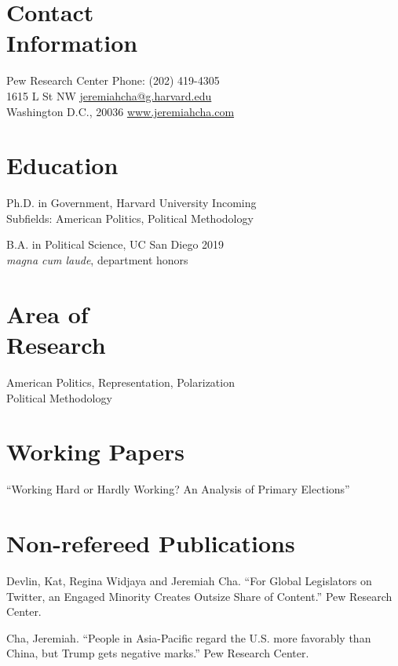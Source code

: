 \documentclass[margin, line]{res}
\begin{document}
\begin{resume}

\section{Contact \\ Information} 
Pew Research Center \hfill Phone: (202) 419-4305\\
1615 L St NW \hfill \href{mailto:jeremiahcha@g.harvard.edu}{jeremiahcha@g.harvard.edu}\\
Washington D.C., 20036 \hfill \href{httsp://www.jeremiahcha.com}{www.jeremiahcha.com}

\section{Education} 
Ph.D. in Government, Harvard University \hfill Incoming\\
\hspace*{5mm}Subfields: American Politics, Political Methodology

B.A. in Political Science, UC San Diego \hfill 2019\\
\hspace*{5mm}\textit{magna cum laude}, department honors

\section{Area of \\Research} 
American Politics, Representation, Polarization\\
Political Methodology

\section{Working Papers} 
``Working Hard or Hardly Working? An Analysis of Primary Elections''

\section{Non-refereed Publications}
Devlin, Kat, Regina Widjaya and Jeremiah Cha. ``For Global Legislators on Twitter, an Engaged Minority Creates Outsize Share of Content.'' Pew Research Center. 

Cha, Jeremiah. ``People in Asia-Pacific regard the U.S. more favorably than China, but Trump gets negative marks.'' Pew Research Center.


\end{resume}
\end{document}
